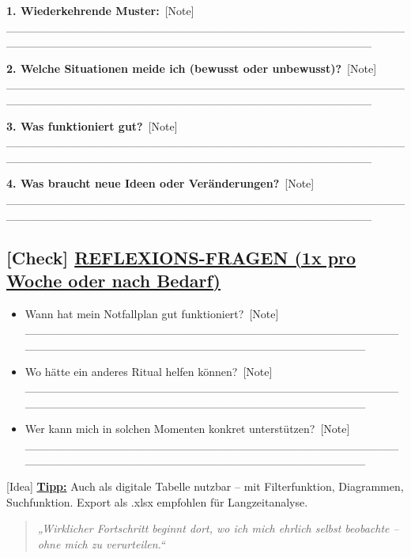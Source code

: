 \textbf{1. Wiederkehrende Muster:}\
[Note] \_\_\_\_\_\_\_\_\_\_\_\_\_\_\_\_\_\_\_\_\_\_\_\_\_\_\_\_\_\_\_\_\_\_\_\_\_\_\_\_\_\_\_\_\_\_\_\_\_\_\_\_\_\_\_\_\_\_\_\_\_\_\_\_\_\_\_\_\_\_\_\_\_\_\_\_\_\_\_\_\_\_\_\_\_\_\_\_\_\_\_\_

\textbf{2. Welche Situationen meide ich (bewusst oder unbewusst)?}\
[Note] \_\_\_\_\_\_\_\_\_\_\_\_\_\_\_\_\_\_\_\_\_\_\_\_\_\_\_\_\_\_\_\_\_\_\_\_\_\_\_\_\_\_\_\_\_\_\_\_\_\_\_\_\_\_\_\_\_\_\_\_\_\_\_\_\_\_\_\_\_\_\_\_\_\_\_\_\_\_\_\_\_\_\_\_\_\_\_\_\_\_\_\_

\textbf{3. Was funktioniert gut?}\
[Note] \_\_\_\_\_\_\_\_\_\_\_\_\_\_\_\_\_\_\_\_\_\_\_\_\_\_\_\_\_\_\_\_\_\_\_\_\_\_\_\_\_\_\_\_\_\_\_\_\_\_\_\_\_\_\_\_\_\_\_\_\_\_\_\_\_\_\_\_\_\_\_\_\_\_\_\_\_\_\_\_\_\_\_\_\_\_\_\_\_\_\_\_

\textbf{4. Was braucht neue Ideen oder Veränderungen?}\
[Note] \_\_\_\_\_\_\_\_\_\_\_\_\_\_\_\_\_\_\_\_\_\_\_\_\_\_\_\_\_\_\_\_\_\_\_\_\_\_\_\_\_\_\_\_\_\_\_\_\_\_\_\_\_\_\_\_\_\_\_\_\_\_\_\_\_\_\_\_\_\_\_\_\_\_\_\_\_\_\_\_\_\_\_\_\_\_\_\_\_\_\_\_

\hypertarget{reflexions-fragen-1x-pro-woche-oder-nach-bedarf}{%
\subsection{\texorpdfstring{[Check] \textbf{\ul{REFLEXIONS-FRAGEN (1x pro Woche oder nach Bedarf)}}}{[Check] REFLEXIONS-FRAGEN (1x pro Woche oder nach Bedarf)}}\label{reflexions-fragen-1x-pro-woche-oder-nach-bedarf}}

\begin{itemize}
\item
  Wann hat mein Notfallplan gut funktioniert?\
  [Note] \_\_\_\_\_\_\_\_\_\_\_\_\_\_\_\_\_\_\_\_\_\_\_\_\_\_\_\_\_\_\_\_\_\_\_\_\_\_\_\_\_\_\_\_\_\_\_\_\_\_\_\_\_\_\_\_\_\_\_\_\_\_\_\_\_\_\_\_\_\_\_\_\_\_\_\_\_\_\_\_\_\_\_\_\_\_
\item
  Wo hätte ein anderes Ritual helfen können?\
  [Note] \_\_\_\_\_\_\_\_\_\_\_\_\_\_\_\_\_\_\_\_\_\_\_\_\_\_\_\_\_\_\_\_\_\_\_\_\_\_\_\_\_\_\_\_\_\_\_\_\_\_\_\_\_\_\_\_\_\_\_\_\_\_\_\_\_\_\_\_\_\_\_\_\_\_\_\_\_\_\_\_\_\_\_\_\_\_
\item
  Wer kann mich in solchen Momenten konkret unterstützen?\
  [Note] \_\_\_\_\_\_\_\_\_\_\_\_\_\_\_\_\_\_\_\_\_\_\_\_\_\_\_\_\_\_\_\_\_\_\_\_\_\_\_\_\_\_\_\_\_\_\_\_\_\_\_\_\_\_\_\_\_\_\_\_\_\_\_\_\_\_\_\_\_\_\_\_\_\_\_\_\_\_\_\_\_\_\_\_\_\_
\end{itemize}

[Idea] \textbf{\ul{Tipp:}} Auch als digitale Tabelle nutzbar -- mit Filterfunktion, Diagrammen, Suchfunktion. Export als .xlsx empfohlen für Langzeitanalyse.

\begin{quote}
\emph{„Wirklicher Fortschritt beginnt dort, wo ich mich ehrlich selbst beobachte -- ohne mich zu verurteilen.``}
\end{quote}
